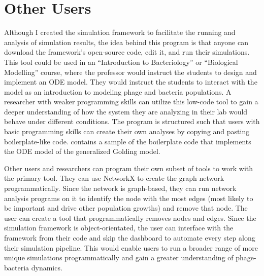 \section{Other Users}
Although I created the simulation framework to facilitate the running and analysis of simulation results, the idea behind this program is that anyone can download the framework’s open-source code, edit it, and run their simulations. 
This tool could be used in an “Introduction to Bacteriology” or “Biological Modelling” course, where the professor would instruct the students to design and implement an ODE model. 
They would instruct the students to interact with the model as an introduction to modeling phage and bacteria populations. 
A researcher with weaker programming skills can utilize this low-code tool to gain a deeper understanding of how the system they are analyzing in their lab would behave under different conditions. 
The program is structured such that users with basic programming skills can create their own analyses by copying and pasting boilerplate-like code.
 contains a sample of the boilerplate code that implements the ODE model of the generalized Golding model.


Other users and researchers can program their own subset of tools to work with the primary tool.
They can use NetworkX to create the graph network programmatically.
Since the network is graph-based, they can run network analysis programs on it to identify the node with the most edges (most likely to be important and drive other population growths) and remove that node.
The user can create a tool that programmatically removes nodes and edges. 
Since the simulation framework is object-orientated, the user can interface with the framework from their code and skip the dashboard to automate every step along their simulation pipeline. 
This would enable users to run a broader range of more unique simulations programmatically and gain a greater understanding of phage-bacteria dynamics. 